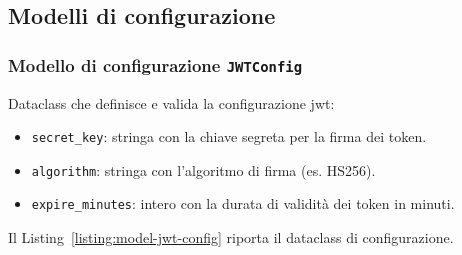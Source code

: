 \subsection{Modelli di configurazione}

\subsubsection{Modello di configurazione \texttt{JWTConfig}}
\label{sec:code-jwt-config}
Dataclass che definisce e valida la configurazione \acrshort{jwt}:
\begin{itemize}
    \item \texttt{secret\_key}: stringa con la chiave segreta per la firma dei token.
    \item \texttt{algorithm}: stringa con l’algoritmo di firma (es. HS256).
    \item \texttt{expire\_minutes}: intero con la durata di validità dei token in minuti.
\end{itemize}
Il Listing~\ref{listing:model-jwt-config} riporta il dataclass di configurazione.
\captionsetup{type=listing, belowskip=0pt}
\inputminted[fontsize=\small, breaklines, breakanywhere=true, linenos=true, bgcolor=gray!10]{python}{code/models/jwt_config.py}
\label{listing:model-jwt-config}

